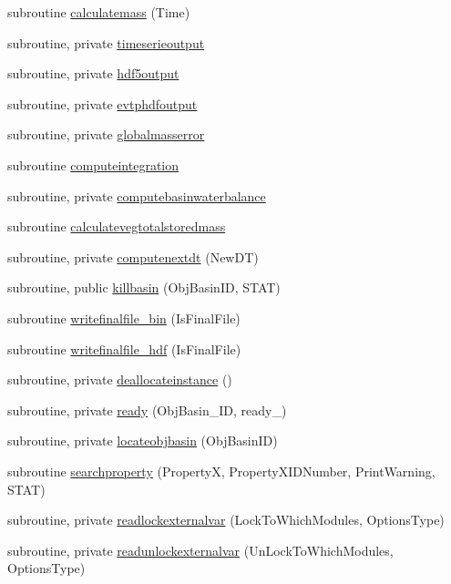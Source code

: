 \begin{DoxyCompactItemize}
\item 
subroutine \mbox{\hyperlink{namespacemodulebasin_af1427c4ade7156552be2283259050d1d}{calculatemass}} (Time)
\item 
subroutine, private \mbox{\hyperlink{namespacemodulebasin_a5d090cabe217c5ee21e1b627217a129f}{timeserieoutput}}
\item 
subroutine, private \mbox{\hyperlink{namespacemodulebasin_a728974f3cdc06d12227aa4b65b29b574}{hdf5output}}
\item 
subroutine, private \mbox{\hyperlink{namespacemodulebasin_ac386c2a8b57550077a00db68e3c300ab}{evtphdfoutput}}
\item 
subroutine, private \mbox{\hyperlink{namespacemodulebasin_ac258b876198ebb36e6bb2b0fd0399158}{globalmasserror}}
\item 
subroutine \mbox{\hyperlink{namespacemodulebasin_a9ef4a0de552e03dfcc7dc780e6162af7}{computeintegration}}
\item 
subroutine, private \mbox{\hyperlink{namespacemodulebasin_ad852fa9f51f06a8aad01fbf81cfd7015}{computebasinwaterbalance}}
\item 
subroutine \mbox{\hyperlink{namespacemodulebasin_a00fd3009ac96d7478c5ad365f4438954}{calculatevegtotalstoredmass}}
\item 
subroutine, private \mbox{\hyperlink{namespacemodulebasin_a3f14e909944d51caacaf3104b755d817}{computenextdt}} (New\+DT)
\item 
subroutine, public \mbox{\hyperlink{namespacemodulebasin_a766c9c7d623f8a8392b3ed324921f71c}{killbasin}} (Obj\+Basin\+ID, S\+T\+AT)
\item 
subroutine \mbox{\hyperlink{namespacemodulebasin_ab2ed3d304db416a0172609e73be05bd4}{writefinalfile\+\_\+bin}} (Is\+Final\+File)
\item 
subroutine \mbox{\hyperlink{namespacemodulebasin_af6daa86ceef2fea67fa23aaebaf588f1}{writefinalfile\+\_\+hdf}} (Is\+Final\+File)
\item 
subroutine, private \mbox{\hyperlink{namespacemodulebasin_a1aae2d1fbf8f2ccffa519261e67515b3}{deallocateinstance}} ()
\item 
subroutine, private \mbox{\hyperlink{namespacemodulebasin_afed1d3ff36b21d7528bddef4df954906}{ready}} (Obj\+Basin\+\_\+\+ID, ready\+\_\+)
\item 
subroutine, private \mbox{\hyperlink{namespacemodulebasin_a44bb775ef055614008b8afd7ca4b77f4}{locateobjbasin}} (Obj\+Basin\+ID)
\item 
subroutine \mbox{\hyperlink{namespacemodulebasin_aa2e4e95b7bf5ee3e53a64d7f2269c946}{searchproperty}} (PropertyX, Property\+X\+I\+D\+Number, Print\+Warning, S\+T\+AT)
\item 
subroutine, private \mbox{\hyperlink{namespacemodulebasin_adebce1a3581c733f01c10813a94c4dea}{readlockexternalvar}} (Lock\+To\+Which\+Modules, Options\+Type)
\item 
subroutine, private \mbox{\hyperlink{namespacemodulebasin_aff09c4da760fd9cda4b797242d7ff522}{readunlockexternalvar}} (Un\+Lock\+To\+Which\+Modules, Options\+Type)
\end{DoxyCompactItemize}

